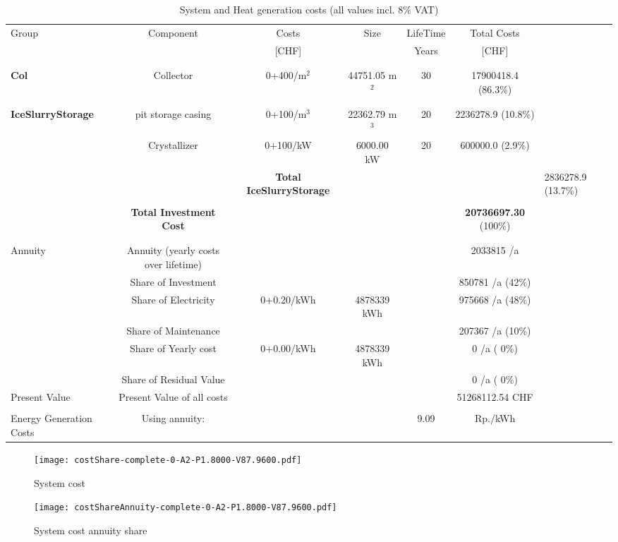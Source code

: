 \documentclass[english]{SPFShortReport}
\begin{document}
\begin{table}[!ht]
\centering
\caption{System and Heat generation costs (all values incl. 8$\%$ VAT) }
\begin{adjustbox}{max width =\textwidth}
\begin{tabular}{l | c c c c c } 
\hline
\hline
Group &Component &Costs &Size &LifeTime &Total Costs \\ 
 & &[CHF] & &Years &[CHF]\\ 
\hline
\\
\hline \\
\textbf{Col} & Collector & 0+400/m$^2$ & 44751.05 m$^2$ & 30 & 17900418.4 (86.3\%) \\
\hline \\
\hline \\
\textbf{IceSlurryStorage} & pit storage casing & 0+100/m$^3$ & 22362.79 m$^3$ & 20 & 2236278.9 (10.8\%) \\
 & Crystallizer & 0+100/kW & 6000.00 kW & 20 & 600000.0 (2.9\%) \\
&
 & \textbf{Total IceSlurryStorage} & & & & 2836278.9 (13.7\%) \\
\hline \\
 & \textbf{Total Investment Cost} & & & & \textbf{20736697.30} (100\%) \\ 
\hline \\ 
\hline \\ 
Annuity & Annuity (yearly costs over lifetime)  &&& & 2033815 /a  \\
 & Share of Investment & &&& 850781 /a (42\%) \\
 & Share of Electricity & 0+0.20/kWh & 4878339 kWh &  & 975668 /a (48\%)\\
 & Share of Maintenance & &&& 207367 /a (10\%)\\ 
 & Share of Yearly cost & 0+0.00/kWh & 4878339 kWh & &  0 /a ( 0\%)\\
 & Share of Residual Value &&& &  0 /a ( 0\%)\\
Present Value  & Present Value of all costs  & &&& 51268112.54 CHF \\
\hline \\ 
 Energy Generation Costs & Using annuity: &&& 9.09 & Rp./kWh \\
\hline
\hline
\end{tabular}
\end{adjustbox}
\label{CostsTable}
\end{table}
\begin{figure}[!htbp]
\begin{center}
\texttt{[image: costShare-complete-0-A2-P1.8000-V87.9600.pdf]}
\caption{System cost}
\label{systemCost}
\end{center}
\end{figure}
\begin{figure}[!htbp]
\begin{center}
\texttt{[image: costShareAnnuity-complete-0-A2-P1.8000-V87.9600.pdf]}
\caption{System cost annuity share}
\label{systemCostannuity}
\end{center}
\end{figure}
\end{document}
